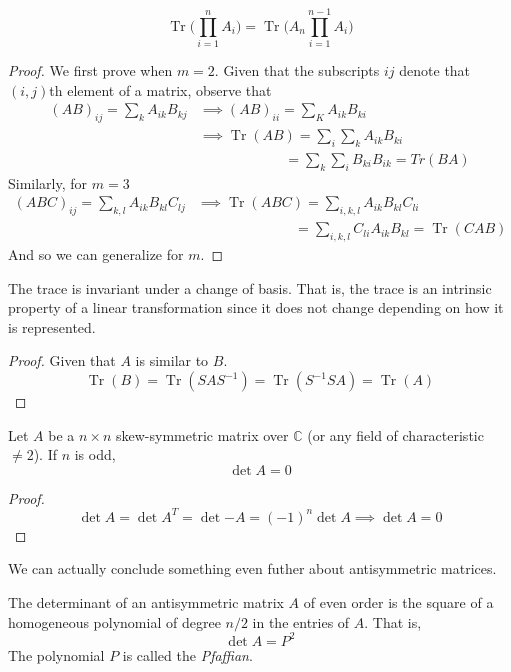 \documentclass{article}
\DeclareMathOperator{\Tr}{Tr}
\begin{document}
  \begin{theorem}
  \[\Tr{\bigg(\prod_{i=1}^n A_i\bigg)} = \Tr{\bigg(A_n \prod_{i=1}^{n-1} A_i\bigg)}\]
  \end{theorem}
  \begin{proof}
  We first prove when $m=2$. Given that the subscripts $i j$ denote that $(i,j)$th element of a matrix, observe that
  \begin{align*}
      (AB)_{ij} = \sum_{k} A_{ik} B_{kj} & \implies (AB)_{ii} = \sum_{K} A_{ik} B_{ki} \\
      & \implies \Tr(AB) = \sum_{i} \sum_{k} A_{ik} B_{ki} \\
      & \;\;\;\;\;\;\;\;\;\;\;\;\;\;\;\;\;\;\;\;\;\;= \sum_{k} \sum_{i} B_{ki} B_{ik} = Tr(BA)
  \end{align*}
  Similarly, for $m=3$
  \begin{align*}
      (ABC)_{ij} = \sum_{k,l} A_{ik} B_{kl} C_{lj} & \implies \Tr(ABC) = \sum_{i,k,l} A_{ik} B_{kl} C_{li} \\ 
      & \;\;\;\;\;\;\;\;\;\;\;\;\;\;\;\;\;\;\;\;\;\;\;\;\;= \sum_{i,k,l} C_{li} A_{ik} B_{kl} = \Tr(CAB)
  \end{align*}
  And so we can generalize for $m$. 
  \end{proof}

  \begin{corollary}
  The trace is invariant under a change of basis. That is, the trace is an intrinsic property of a linear transformation since it does not change depending on how it is represented. 
  \end{corollary}
  \begin{proof}
  Given that $A$ is similar to $B$. 
  \[\Tr(B) = \Tr(S A S^{-1}) = \Tr(S^{-1} S A) = \Tr(A) \]
  \end{proof}

  \begin{theorem}
  Let $A$ be a $n \times n$ skew-symmetric matrix over $\mathbb{C}$ (or any field of characteristic $\neq 2$). If $n$ is odd, 
  \[\det{A} = 0 \]
  \end{theorem}
  \begin{proof}
  \[\det{A} = \det{A^T} = \det{-A} = (-1)^n \det{A} \implies \det{A} = 0 \]
  \end{proof}

  We can actually conclude something even futher about antisymmetric matrices. 

  \begin{theorem}
  The determinant of an antisymmetric matrix $A$ of even order is the square of a homogeneous polynomial of degree $n/2$ in the entries of $A$. That is, 
  \[\det{A} = P^2\]
  The polynomial $P$ is called the \textit{Pfaffian}. 
  \end{theorem}
\end{document}
